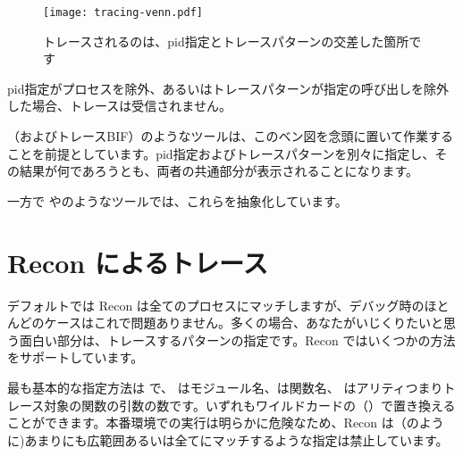 \begin{figure}
  \texttt{[image: tracing-venn.pdf]}%
  \centering%
  \caption{トレースされるのは、pid指定とトレースパターンの交差した箇所です}%
   \label{fig:tracing-venn}
\end{figure}

pid指定がプロセスを除外、あるいはトレースパターンが指定の呼び出しを除外した場合、トレースは受信されません。

（およびトレースBIF）のようなツールは、このベン図を念頭に置いて作業することを前提としています。pid指定およびトレースパターンを別々に指定し、その結果が何であろうとも、両者の共通部分が表示されることになります。

\FloatBarrier
一方で やのようなツールでは、これらを抽象化しています。

\section{Recon によるトレース}

デフォルトでは Recon は全てのプロセスにマッチしますが、デバッグ時のほとんどのケースはこれで問題ありません。多くの場合、あなたがいじくりたいと思う面白い部分は、トレースするパターンの指定です。Recon ではいくつかの方法をサポートしています。

最も基本的な指定方法は で、 はモジュール名、は関数名、 はアリティつまりトレース対象の関数の引数の数です。いずれもワイルドカードの（）で置き換えることができます。本番環境での実行は明らかに危険なため、Recon は（のように)あまりにも広範囲あるいは全てにマッチするような指定は禁止しています。

